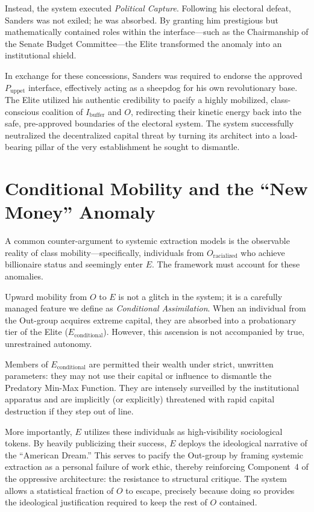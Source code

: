 \documentclass[12pt,openany]{book}
\begin{document}
Instead, the system executed \textit{Political Capture}. Following his electoral defeat, Sanders was not exiled; he was absorbed. By granting him prestigious but mathematically contained roles within the interface---such as the Chairmanship of the Senate Budget Committee---the Elite transformed the anomaly into an institutional shield.

In exchange for these concessions, Sanders was required to endorse the approved $P_{\text{uppet}}$ interface, effectively acting as a sheepdog for his own revolutionary base. The Elite utilized his authentic credibility to pacify a highly mobilized, class-conscious coalition of $I_{\text{buffer}}$ and $O$, redirecting their kinetic energy back into the safe, pre-approved boundaries of the electoral system. The system successfully neutralized the decentralized capital threat by turning its architect into a load-bearing pillar of the very establishment he sought to dismantle.

\section{Conditional Mobility and the ``New Money'' Anomaly}

A common counter-argument to systemic extraction models is the observable reality of class mobility---specifically, individuals from $O_{\text{racialized}}$ who achieve billionaire status and seemingly enter $E$. The framework must account for these anomalies.

Upward mobility from $O$ to $E$ is not a glitch in the system; it is a carefully managed feature we define as \textit{Conditional Assimilation}. When an individual from the Out-group acquires extreme capital, they are absorbed into a probationary tier of the Elite ($E_{\text{conditional}}$). However, this ascension is not accompanied by true, unrestrained autonomy.

Members of $E_{\text{conditional}}$ are permitted their wealth under strict, unwritten parameters: they may not use their capital or influence to dismantle the Predatory Min-Max Function. They are intensely surveilled by the institutional apparatus and are implicitly (or explicitly) threatened with rapid capital destruction if they step out of line.

More importantly, $E$ utilizes these individuals as high-visibility sociological tokens. By heavily publicizing their success, $E$ deploys the ideological narrative of the ``American Dream.'' This serves to pacify the Out-group by framing systemic extraction as a personal failure of work ethic, thereby reinforcing Component~4 of the oppressive architecture: the resistance to structural critique. The system allows a statistical fraction of $O$ to escape, precisely because doing so provides the ideological justification required to keep the rest of $O$ contained.
\end{document}
